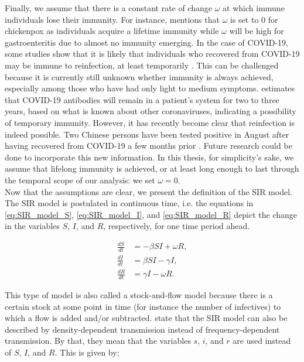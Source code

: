 \documentclass[12pt]{article}
\begin{document}
	Finally, we assume that there is a constant rate of change $\omega$ at which immune individuals lose their immunity. For instance, \textcite{adda2016economic} mentions that $\omega$ is set to 0 for chickenpox as individuals acquire a lifetime immunity while $\omega$ will be high for gastroenteritis due to almost no immunity emerging. In the case of COVID-19, some studies show that it is likely that individuals who recovered from COVID-19 may be immune to reinfection, at least temporarily \parencite{kirkcaldy2020covid}. This can be challenged because it is currently still unknown whether immunity is always achieved, especially among those who have had only light to medium symptoms. \textcite{leung_2020} estimates that COVID-19 antibodies will remain in a patient’s system for two to three years, based on what is known about other coronaviruses, indicating a possibility of temporary immunity. However, it has recently become clear that reinfection is indeed possible. Two Chinese persons have been tested positive in August after having recovered from COVID-19 a few months prior \parencite{bloomberg2020reinfection}. Future research could be done to incorporate this new information. In this thesis, for simplicity's sake, we assume that lifelong immunity is achieved, or at least long enough to last through the temporal scope of our analysis: we set $\omega = 0$. \\
	
	Now that the assumptions are clear, we present the definition of the SIR model. The SIR model is postulated in continuous time, i.e. the equations in \eqref{eq:SIR_model_S}, \eqref{eq:SIR_model_I}, and \eqref{eq:SIR_model_R} depict the change in the variables $S$, $I$, and $R$, respectively, for one time period ahead.
	
	\begin{align}
    	\frac{dS}{dt} &= -\beta SI + \omega R, \label{eq:SIR_model_S}\\
    	\frac{dI}{dt} &= \beta SI - \gamma I, \label{eq:SIR_model_I}\\
    	\frac{dR}{dt} &= \gamma I - \omega R. \label{eq:SIR_model_R}
	\end{align}
	
	This type of model is also called a stock-and-flow model because there is a certain stock at some point in time (for instance the number of infectives) to which a flow is added and/or subtracted. \textcite{keeling2011modeling} state that the SIR model can also be described by density-dependent transmission instead of frequency-dependent transmission. By that, they mean that the variables $s$, $i$, and $r$ are used instead of $S$, $I$, and $R$. This is given by:
	
\end{document}
